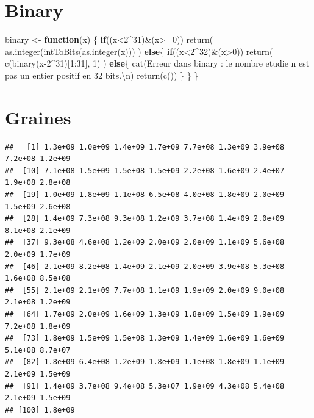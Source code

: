 \documentclass[
]{article}
\newenvironment{Shaded}{\begin{snugshade}}{\end{snugshade}}
\newcommand{\ControlFlowTok}[1]{\textcolor[rgb]{0.13,0.29,0.53}{\textbf{#1}}}
\newcommand{\DecValTok}[1]{\textcolor[rgb]{0.00,0.00,0.81}{#1}}
\newcommand{\FunctionTok}[1]{\textcolor[rgb]{0.00,0.00,0.00}{#1}}
\newcommand{\NormalTok}[1]{#1}
\newcommand{\OtherTok}[1]{\textcolor[rgb]{0.56,0.35,0.01}{#1}}
\newcommand{\SpecialCharTok}[1]{\textcolor[rgb]{0.00,0.00,0.00}{#1}}
\newcommand{\StringTok}[1]{\textcolor[rgb]{0.31,0.60,0.02}{#1}}
\begin{document}
\section*{Binary}

\label{subsec:binary}

\begin{Shaded}
\begin{Highlighting}[]
\NormalTok{binary }\OtherTok{\textless{}{-}} \ControlFlowTok{function}\NormalTok{(x)}
\NormalTok{\{}
  \ControlFlowTok{if}\NormalTok{((x}\SpecialCharTok{\textless{}}\DecValTok{2}\SpecialCharTok{\^{}}\DecValTok{31}\NormalTok{)}\SpecialCharTok{\&}\NormalTok{(x}\SpecialCharTok{\textgreater{}=}\DecValTok{0}\NormalTok{))}
    \FunctionTok{return}\NormalTok{( }\FunctionTok{as.integer}\NormalTok{(}\FunctionTok{intToBits}\NormalTok{(}\FunctionTok{as.integer}\NormalTok{(x))) )}
  \ControlFlowTok{else}\NormalTok{\{}
    \ControlFlowTok{if}\NormalTok{((x}\SpecialCharTok{\textless{}}\DecValTok{2}\SpecialCharTok{\^{}}\DecValTok{32}\NormalTok{)}\SpecialCharTok{\&}\NormalTok{(x}\SpecialCharTok{\textgreater{}}\DecValTok{0}\NormalTok{))}
      \FunctionTok{return}\NormalTok{( }\FunctionTok{c}\NormalTok{(}\FunctionTok{binary}\NormalTok{(x}\DecValTok{{-}2}\SpecialCharTok{\^{}}\DecValTok{31}\NormalTok{)[}\DecValTok{1}\SpecialCharTok{:}\DecValTok{31}\NormalTok{], }\DecValTok{1}\NormalTok{) )}
    \ControlFlowTok{else}\NormalTok{\{}
      \FunctionTok{cat}\NormalTok{(}\StringTok{\textquotesingle{}Erreur dans binary : le nombre etudie n est pas un entier positif en 32 bits.}\SpecialCharTok{\textbackslash{}n}\StringTok{\textquotesingle{}}\NormalTok{)}
      \FunctionTok{return}\NormalTok{(}\FunctionTok{c}\NormalTok{())}
\NormalTok{    \}}
\NormalTok{  \}}
\NormalTok{\}}
\end{Highlighting}
\end{Shaded}

\section*{Graines}

\begin{verbatim}
##   [1] 1.3e+09 1.0e+09 1.4e+09 1.7e+09 7.7e+08 1.3e+09 3.9e+08 7.2e+08 1.2e+09
##  [10] 7.1e+08 1.5e+09 1.5e+08 1.5e+09 2.2e+08 1.6e+09 2.4e+07 1.9e+08 2.8e+08
##  [19] 1.0e+09 1.8e+09 1.1e+08 6.5e+08 4.0e+08 1.8e+09 2.0e+09 1.5e+09 2.6e+08
##  [28] 1.4e+09 7.3e+08 9.3e+08 1.2e+09 3.7e+08 1.4e+09 2.0e+09 8.1e+08 2.1e+09
##  [37] 9.3e+08 4.6e+08 1.2e+09 2.0e+09 2.0e+09 1.1e+09 5.6e+08 2.0e+09 1.7e+09
##  [46] 2.1e+09 8.2e+08 1.4e+09 2.1e+09 2.0e+09 3.9e+08 5.3e+08 1.6e+08 8.5e+08
##  [55] 2.1e+09 2.1e+09 7.7e+08 1.1e+09 1.9e+09 2.0e+09 9.0e+08 2.1e+08 1.2e+09
##  [64] 1.7e+09 2.0e+09 1.6e+09 1.3e+09 1.8e+09 1.5e+09 1.9e+09 7.2e+08 1.8e+09
##  [73] 1.8e+09 1.5e+09 1.5e+08 1.3e+09 1.4e+09 1.6e+09 1.6e+09 5.1e+08 8.7e+07
##  [82] 1.8e+09 6.4e+08 1.2e+09 1.8e+09 1.1e+08 1.8e+09 1.1e+09 2.1e+09 1.5e+09
##  [91] 1.4e+09 3.7e+08 9.4e+08 5.3e+07 1.9e+09 4.3e+08 5.4e+08 2.1e+09 1.5e+09
## [100] 1.8e+09
\end{verbatim}
\end{document}
